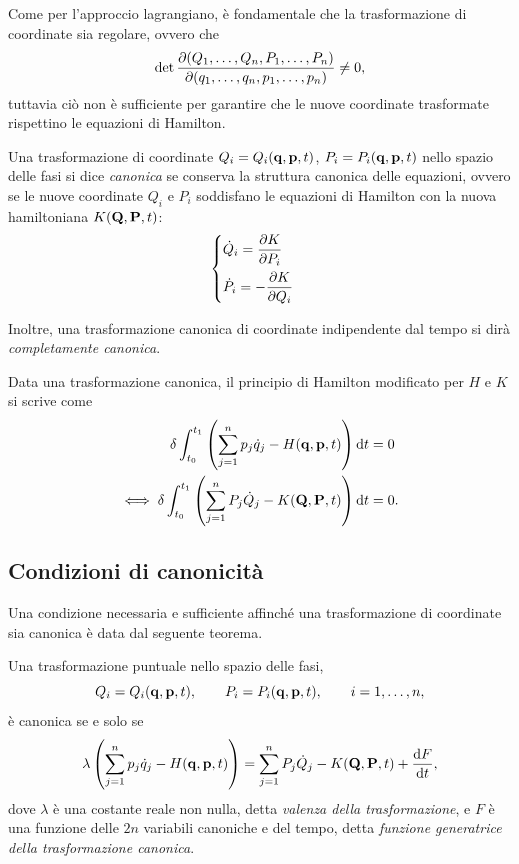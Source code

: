 Come per l'approccio lagrangiano, è fondamentale che la trasformazione di coordinate sia regolare, ovvero che 
\begin{equation*}
\det \pdv{(Q_1, \dots, Q_n, P_1, \dots, P_n)}{(q_1, \dots, q_n, p_1, \dots, p_n)} \neq 0,
\end{equation*}
tuttavia ciò non è sufficiente per garantire che le nuove coordinate trasformate rispettino le equazioni di Hamilton.

\begin{definition}
    Una trasformazione di coordinate $Q_i = Q_i(\vb{q}, \vb{p}, t)$, $P_i=P_i(\vb{q},\vb{p}, t)$ nello spazio delle fasi si dice \emph{canonica} se conserva la struttura canonica delle equazioni, ovvero se le nuove coordinate $Q_i$ e $P_i$ soddisfano le equazioni di Hamilton con la nuova hamiltoniana $K(\vb{Q}, \vb{P}, t)$:
    \begin{equation*}
        \begin{cases}
            \displaystyle \dot{Q}_i = \pdv{K}{P_i} \\[0.3cm]
            \displaystyle \dot{P}_i = -\pdv{K}{Q_i}
        \end{cases}
    \end{equation*}

    Inoltre, una trasformazione canonica di coordinate indipendente dal tempo si dirà \emph{completamente canonica}.
\end{definition}

Data una trasformazione canonica, il principio di Hamilton modificato per $H$ e $K$ si scrive come
\begin{align*}
    \var \int_{t_0}^{t_1} \left( \sum_{j=1}^n p_j \dot{q}_j - H(\vb{q}, \vb{p}, t) \right) \dd{t} &= 0 \\
    \iff \var \int_{t_0}^{t_1} \left( \sum_{j=1}^n P_j \dot{Q}_j - K(\vb{Q}, \vb{P}, t) \right) \dd{t} &= 0.
\end{align*}

\subsection{Condizioni di canonicità}
Una condizione necessaria e sufficiente affinché una trasformazione di coordinate sia canonica è data dal seguente teorema.

\begin{theorem}
    Una trasformazione puntuale nello spazio delle fasi,
    \begin{equation*}
        Q_i = Q_i(\vb{q}, \vb{p}, t), \qquad P_i = P_i(\vb{q}, \vb{p}, t), \qquad i = 1, \dots, n,
    \end{equation*}
    è canonica se e solo se 
    \begin{equation*}
        \lambda \left(\sum_{j=1}^n p_j \dot{q}_j - H(\vb{q}, \vb{p}, t)\right) = \sum_{j=1}^n P_j \dot{Q}_j - K(\vb{Q}, \vb{P}, t) + \dv{F}{t},
    \end{equation*}
    dove $\lambda$ è una costante reale non nulla, detta \emph{valenza della trasformazione}, e $F$ è una funzione delle $2n$ variabili canoniche e del tempo, detta \emph{funzione generatrice della trasformazione canonica}.
\end{theorem}

